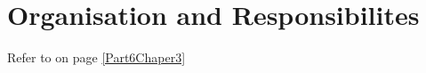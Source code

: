 
\chapter{Organisation and Responsibilites} %

\label{Part4Chapter4} %


Refer to  on page \ref{Part6Chaper3}